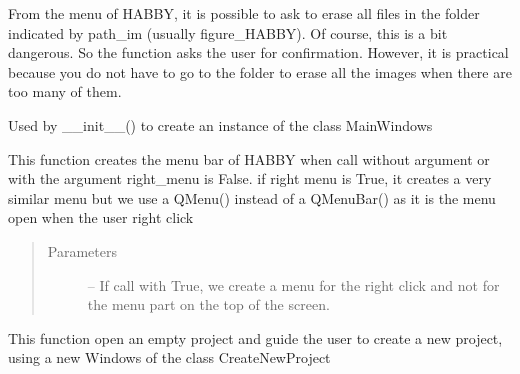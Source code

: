 \documentclass[letterpaper,10pt,english]{sphinxmanual}
\begin{document}
\begin{fulllineitems}
\begin{fulllineitems}
From the menu of HABBY, it is possible to ask to erase all files in the folder indicated by path\_im
(usually figure\_HABBY). Of course, this is a bit dangerous. So the function asks the user for confirmation.
However, it is practical because you do not have to go to the folder to erase all the images when there
are too many of them.

\end{fulllineitems}


\begin{fulllineitems}
\label{\detokenize{index:src_GUI.Main_windows_1.MainWindows.init_ui}}
Used by \_\_init\_\_() to create an instance of the class MainWindows

\end{fulllineitems}


\begin{fulllineitems}
\label{\detokenize{index:src_GUI.Main_windows_1.MainWindows.my_menu_bar}}
This function creates the menu bar of HABBY when call without argument or with the argument right\_menu is False.
if right menu is True, it creates a very similar menu but we use a QMenu() instead of a QMenuBar() as it
is the menu open when the user right click
\begin{quote}\begin{description}
\item[{Parameters}] \leavevmode
{} -- If call with True, we create a menu for the right click and not for the menu part on the top
of the screen.

\end{description}\end{quote}

\end{fulllineitems}


\begin{fulllineitems}
\label{\detokenize{index:src_GUI.Main_windows_1.MainWindows.new_project}}
This function open an empty project and guide the user to create a new project, using a new Windows
of the class CreateNewProject


\end{fulllineitems}
\end{fulllineitems}
\end{document}

